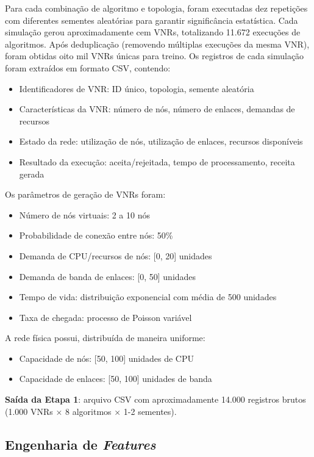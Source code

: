 \documentclass[conference]{IEEEtran}
\begin{document}
Para cada combinação de algoritmo e topologia, foram executadas dez repetições com diferentes sementes aleatórias para garantir significância estatística. Cada simulação gerou aproximadamente cem VNRs, totalizando 11.672 execuções de algoritmos. Após deduplicação (removendo múltiplas execuções da mesma VNR), foram obtidas oito mil VNRs únicas para treino. Os registros de cada simulação foram extraídos em formato CSV, contendo:

\begin{itemize}
    \item Identificadores de VNR: ID único, topologia, semente aleatória
    \item Características da VNR: número de nós, número de enlaces, demandas de recursos
    \item Estado da rede: utilização de nós, utilização de enlaces, recursos disponíveis
    \item Resultado da execução: aceita/rejeitada, tempo de processamento, receita gerada
\end{itemize}

Os parâmetros de geração de VNRs foram:

\begin{itemize}
    \item Número de nós virtuais: 2 a 10 nós
    \item Probabilidade de conexão entre nós: 50\%
    \item Demanda de CPU/recursos de nós: [0, 20] unidades
    \item Demanda de banda de enlaces: [0, 50] unidades
    \item Tempo de vida: distribuição exponencial com média de 500 unidades
    \item Taxa de chegada: processo de Poisson variável
\end{itemize}

A rede física possui, distribuída de maneira uniforme:

\begin{itemize}
    \item Capacidade de nós: [50, 100] unidades de CPU
    \item Capacidade de enlaces: [50, 100] unidades de banda
\end{itemize}

\textbf{Saída da Etapa 1}: arquivo CSV com aproximadamente 14.000 registros brutos (1.000 VNRs × 8 algoritmos × 1-2 sementes).

\subsection{Engenharia de \textit{Features}}
\end{document}
